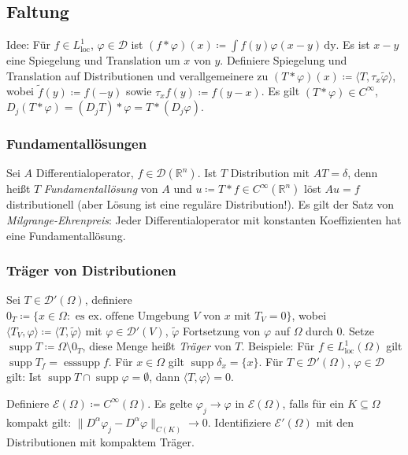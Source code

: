 \documentclass[11pt,a4paper]{scrartcl}
\newcommand{\R}{\mathbb{R}} %
\newcommand{\D}{\mathcal{D}}
\newcommand{\E}{\mathcal{E}}
\theoremstyle{plain}
\theoremstyle{definition}
\theoremstyle{remark}
\DeclareMathOperator{\supp}{supp}
\DeclareMathOperator{\esssupp}{ess supp}
\DeclareMathOperator{\loc}{loc}
\begin{document}
\subsection{Faltung}

Idee: Für $f\in L^1_{\loc}$, $\varphi\in \D$ ist $(f*\varphi)(x)\coloneqq \int f(y)\varphi(x-y) \, \mathrm{dy}$. Es ist $x-y$ eine Spiegelung und Translation um $x$ von $y$. Definiere Spiegelung und Translation auf Distributionen und verallgemeinere zu $(T*\varphi)(x)\coloneqq \langle T, \tau_x \tilde\varphi \rangle$, wobei $\tilde f(y) \coloneqq f(-y)$ sowie $\tau_x f(y) \coloneqq f(y-x)$. Es gilt $(T*\varphi)\in C^\infty$, $D_j (T*\varphi) = (D_j T)*\varphi = T*(D_j \varphi)$.

\subsubsection{Fundamentallösungen}

Sei $A$ Differentialoperator, $f\in \D(\R^n)$. Ist $T$ Distribution mit $AT=\delta$, denn heißt $T$ \emph{Fundamentallösung} von $A$ und $u\coloneqq T*f \in C^\infty(\R^n)$ löst $Au=f$ distributionell (aber Lösung ist eine reguläre Distribution!). Es gilt der Satz von \emph{Milgrange-Ehrenpreis}: Jeder Differentialoperator mit konstanten Koeffizienten hat eine Fundamentallösung.

\subsubsection{Träger von Distributionen}

Sei $T\in \D'(\Omega)$, definiere $0_T\coloneqq \{ x\in\Omega: \text{ es ex. offene Umgebung } V \text{ von } x \text{ mit } T_V = 0 \}$, wobei $\langle T_V, \varphi \rangle \coloneqq \langle T, \tilde\varphi \rangle$ mit $\varphi\in \D'(V)$, $\tilde\varphi$ Fortsetzung von $\varphi$ auf $\Omega$ durch $0$. Setze $\supp T\coloneqq \Omega \setminus 0_T$, diese Menge heißt \emph{Träger} von $T$. Beispiele: Für $f\in L^1_{\loc}(\Omega)$ gilt $\supp T_f = \esssupp f$. Für $x\in\Omega$ gilt $\supp \delta_x = \{ x \}$. Für $T\in \D'(\Omega)$, $\varphi \in \D$ gilt: Ist $\supp T \cap \supp \varphi = \emptyset$, dann $\langle T, \varphi \rangle = 0$.

Definiere $\E(\Omega) \coloneqq C^\infty(\Omega)$. Es gelte $\varphi_j \to \varphi$ in $\E(\Omega)$, falls für ein $K\subseteq \Omega$ kompakt gilt: $\|D^\alpha \varphi_j - D^\alpha \varphi \|_{C(K)} \to 0$.  Identifiziere $\E'(\Omega)$ mit den Distributionen mit kompaktem Träger.
\end{document}
